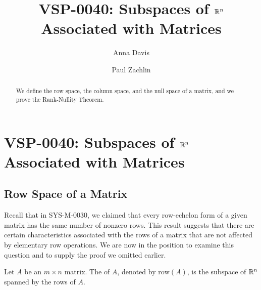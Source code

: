 \documentclass{ximera}
\author{Anna Davis \and Paul Zachlin} \title{VSP-0040: Subspaces of $\mathbb{R}^n$ Associated with Matrices} \license{CC-BY 4.0}
\begin{document}
\begin{abstract}
We define the row space, the column space, and the null space of a matrix, and we prove the Rank-Nullity Theorem.
\end{abstract}
\maketitle
\section*{VSP-0040: Subspaces of $\mathbb{R}^n$ Associated with Matrices}
\subsection*{Row Space of a Matrix}
Recall that in SYS-M-0030, we claimed that every row-echelon form of a given matrix has the same number of nonzero rows.  This result suggests that there are certain characteristics associated with the rows of a matrix that are not affected by elementary row operations.  We are now in the position to examine this question and to supply the proof we omitted earlier.
\begin{definition}\label{def:rowspace} Let $A$ be an $m\times n$ matrix.  The  of $A$, denoted by $\mbox{row}(A)$, is the subspace of $\mathbb{R}^n$ spanned by the rows of $A$.
\end{definition}
\end{document}
